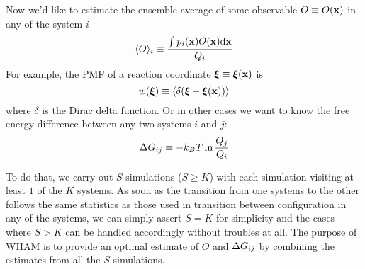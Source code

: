 Now we'd like to estimate the ensemble average of some observable 
$O \equiv O(\mathbf{x})$ in any of the system $i$
\begin{equation}\label{eq:O}
\langle O \rangle_{i} \equiv \frac{\int_{}^{}{p_{i}(\mathbf{x})O}(\mathbf{x})\mathrm{d}\mathbf{x}}{Q_{i}}
\end{equation}
For example, the PMF of a reaction coordinate 
$\boldsymbol\xi \equiv \boldsymbol\xi(\mathbf{x})$ is
\begin{equation}
\label{eq:PMF}
w(\boldsymbol\xi) \equiv \langle \delta(\boldsymbol\xi - \boldsymbol\xi(\mathbf{x})) \rangle 
\end{equation}
where $\delta$ is the Dirac delta function.
Or in other cases we want to know the free energy difference between 
any two systems $i$ and $j$:
\begin{equation}
\mathrm{\Delta}G_{ij} \equiv -k_{B}T \ln\frac{Q_{j}}{Q_{i}}
\label{eq:dG}
\end{equation}

To do that, we carry out $S$ simulations ($S \ge K$) with each 
simulation visiting at least $1$ of the $K$ systems. As soon as the transition 
from one systems to the other follows the same statistics as those used 
in transition between configuration in any of the systems, we can simply 
assert $S = K$ for simplicity and the cases where $S > K$ can be handled 
accordingly without troubles at all. The purpose of WHAM is to provide 
an optimal estimate of $O$ and $\mathrm{\Delta}G_{ij}$ by combining the estimates from 
all the $S$ simulations. 
